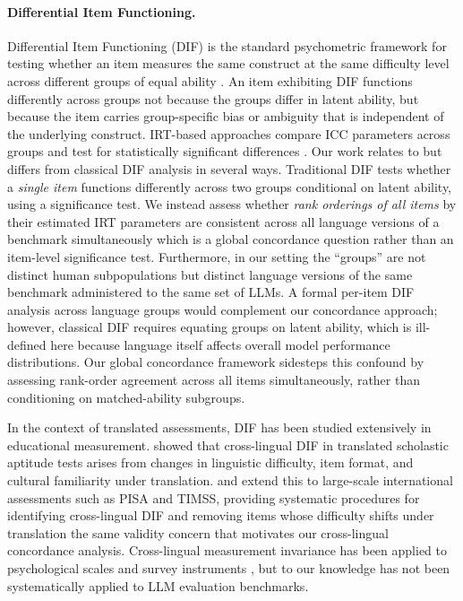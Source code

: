 \documentclass[11pt]{article}
\begin{document}
\paragraph{Differential Item Functioning.}
Differential Item Functioning (DIF) is the standard psychometric framework for testing whether an item measures the same construct at the same difficulty level across different groups of equal ability \cite{holland2012differential}. An item exhibiting DIF functions differently across groups not because the groups differ in latent ability, but because the item carries group-specific bias or ambiguity that is independent of the underlying construct. IRT-based approaches compare ICC parameters across groups and test for statistically significant differences \cite{lord2012applications}. Our work relates to but differs from classical DIF analysis in several ways. Traditional DIF tests whether a \emph{single item} functions differently across two groups conditional on latent ability, using a significance test. We instead assess whether \emph{rank orderings of all items} by their estimated IRT parameters are consistent across all language versions of a benchmark simultaneously which is a global concordance question rather than an item-level significance test. Furthermore, in our setting the ``groups'' are not distinct human subpopulations but distinct language versions of the same benchmark administered to the same set of LLMs. A formal per-item DIF analysis across language groups would complement our
concordance approach; however, classical DIF requires equating groups on latent
ability, which is ill-defined here because language itself affects overall model
performance distributions. Our global concordance framework sidesteps this
confound by assessing rank-order agreement across all items simultaneously,
rather than conditioning on matched-ability subgroups.


In the context of translated assessments, DIF has been studied extensively in educational measurement. \citet{allalouf1999identifying} showed that cross-lingual DIF in translated scholastic aptitude tests arises from changes in linguistic difficulty, item format, and cultural familiarity under translation. \citet{hambleton2005issues} and \citet{grisay2007translation} extend this to large-scale international assessments such as PISA and TIMSS, providing systematic procedures for identifying cross-lingual DIF and removing items whose difficulty shifts under translation the same validity concern that motivates our cross-lingual concordance analysis. Cross-lingual measurement invariance has been applied to psychological scales and survey instruments \cite{milfont2010testing}, but to our knowledge has not been systematically applied to LLM evaluation benchmarks. 
\end{document}
